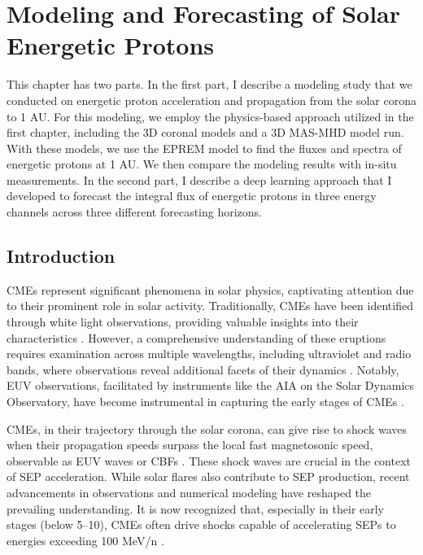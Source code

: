 \chapter{Modeling and Forecasting of Solar Energetic Protons}
\label{chapter4}














This chapter has two parts. In the first part, I describe a modeling study that we conducted on energetic proton acceleration and propagation from the solar corona to 1 AU. For this modeling, we employ the physics-based approach utilized in the first chapter, including the 3D coronal models and a 3D MAS-MHD model run. With these models, we use the EPREM model to find the fluxes and spectra of energetic protons at 1 AU. We then compare the modeling results with in-situ measurements. In the second part, I describe a deep learning approach that I developed to forecast the integral flux of energetic protons in three energy channels across three different forecasting horizons.

\section{Introduction}
\label{sec_ch4_intro}
CMEs represent significant phenomena in solar physics, captivating attention due to their prominent role in solar activity. Traditionally, CMEs have been identified through white light observations, providing valuable insights into their characteristics \citep{vourlidas_2003, zhang_2006, bein_2011}. However, a comprehensive understanding of these eruptions requires examination across multiple wavelengths, including ultraviolet and radio bands, where observations reveal additional facets of their dynamics \citep{bastian_2001, veronig_2010}. Notably, EUV observations, facilitated by instruments like the AIA on the Solar Dynamics Observatory, have become instrumental in capturing the early stages of CMEs \citep{lemen_2012, pesnell_2012}.

CMEs, in their trajectory through the solar corona, can give rise to shock waves when their propagation speeds surpass the local fast magnetosonic speed, observable as EUV waves or CBFs \citep{thompson_1998, long_2011}. These shock waves are crucial in the context of SEP acceleration. While solar flares also contribute to SEP production, recent advancements in observations and numerical modeling have reshaped the prevailing understanding. It is now recognized that, especially in their early stages (below 5–10\rsun), CMEs often drive shocks capable of accelerating SEPs to energies exceeding 100 MeV/n \citep{ontiveross_2009, gopalswamy_2011, battarbee_2013, kozarev_2013, schwadron_2014, kong_2017}.

